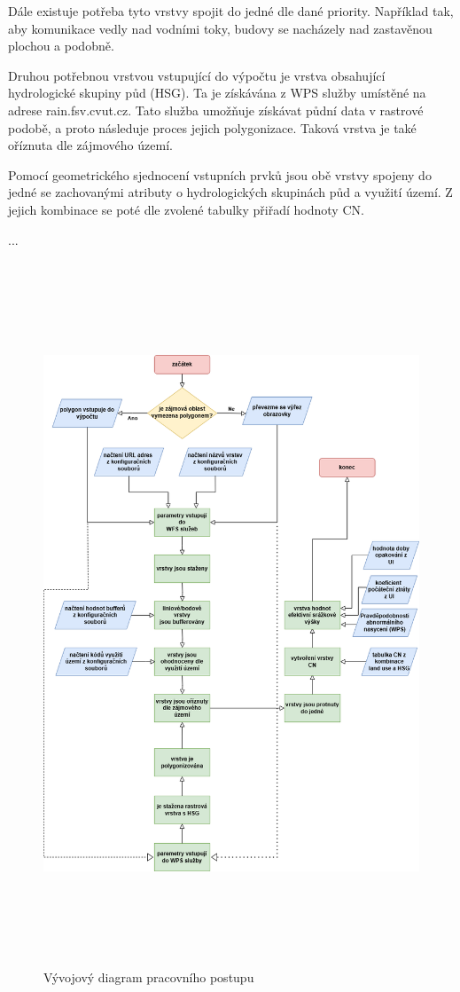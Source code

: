 \documentclass[a4paper,oneside,12pt]{book}
\begin{document}
\hspace{10mm}Dále existuje potřeba tyto vrstvy spojit do jedné dle dané priority. Například tak, aby komunikace vedly nad vodními toky, budovy se nacházely nad zastavěnou plochou a podobně.

\hspace{10mm}Druhou potřebnou vrstvou vstupující do výpočtu je vrstva obsahující hydrologické skupiny půd (HSG). Ta je získávána z WPS služby umístěné na adrese rain.fsv.cvut.cz. Tato služba umožňuje získávat půdní data v rastrové podobě, a proto následuje proces jejich polygonizace. Taková vrstva je také oříznuta dle zájmového území.

\hspace{10mm}Pomocí geometrického sjednocení vstupních prvků jsou obě vrstvy spojeny do jedné se zachovanými atributy o hydrologických skupinách půd a využití území.
Z jejich kombinace se poté dle zvolené tabulky přiřadí hodnoty CN.

...

\begin{figure}[H] \label{obr11}
\centering
\includegraphics[height=21cm]{pictures/diagram.png}
\caption{Vývojový diagram pracovního postupu}
\label{fig:diagram}
\end{figure}
\end{document}

